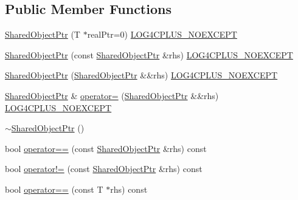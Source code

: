 \subsection*{Public Member Functions}
\begin{DoxyCompactItemize}
\item 
\hyperlink{classlog4cplus_1_1helpers_1_1SharedObjectPtr_a6387c14e4db27c8338825aa9ddc14c98}{Shared\-Object\-Ptr} (T $\ast$real\-Ptr=0) \hyperlink{config_8hxx_a77d156ef570ca81fe10eb864ea349506}{L\-O\-G4\-C\-P\-L\-U\-S\-\_\-\-N\-O\-E\-X\-C\-E\-P\-T}
\item 
\hyperlink{classlog4cplus_1_1helpers_1_1SharedObjectPtr_a7a40fbcc9c9942bdb6f7dc3adb574878}{Shared\-Object\-Ptr} (const \hyperlink{classlog4cplus_1_1helpers_1_1SharedObjectPtr}{Shared\-Object\-Ptr} \&rhs) \hyperlink{config_8hxx_a77d156ef570ca81fe10eb864ea349506}{L\-O\-G4\-C\-P\-L\-U\-S\-\_\-\-N\-O\-E\-X\-C\-E\-P\-T}
\item 
\hyperlink{classlog4cplus_1_1helpers_1_1SharedObjectPtr_a0a152d848cb890b66231dd88716318a2}{Shared\-Object\-Ptr} (\hyperlink{classlog4cplus_1_1helpers_1_1SharedObjectPtr}{Shared\-Object\-Ptr} \&\&rhs) \hyperlink{config_8hxx_a77d156ef570ca81fe10eb864ea349506}{L\-O\-G4\-C\-P\-L\-U\-S\-\_\-\-N\-O\-E\-X\-C\-E\-P\-T}
\item 
\hyperlink{classlog4cplus_1_1helpers_1_1SharedObjectPtr}{Shared\-Object\-Ptr} \& \hyperlink{classlog4cplus_1_1helpers_1_1SharedObjectPtr_a8cfd4cd7dea822742e4658293269b194}{operator=} (\hyperlink{classlog4cplus_1_1helpers_1_1SharedObjectPtr}{Shared\-Object\-Ptr} \&\&rhs) \hyperlink{config_8hxx_a77d156ef570ca81fe10eb864ea349506}{L\-O\-G4\-C\-P\-L\-U\-S\-\_\-\-N\-O\-E\-X\-C\-E\-P\-T}
\item 
\hyperlink{classlog4cplus_1_1helpers_1_1SharedObjectPtr_acea65ae76b84d7bafa18b1bb96c89287}{$\sim$\-Shared\-Object\-Ptr} ()
\item 
bool \hyperlink{classlog4cplus_1_1helpers_1_1SharedObjectPtr_a5a55c916bd3daeb3b4bb3c8b09101983}{operator==} (const \hyperlink{classlog4cplus_1_1helpers_1_1SharedObjectPtr}{Shared\-Object\-Ptr} \&rhs) const 
\item 
bool \hyperlink{classlog4cplus_1_1helpers_1_1SharedObjectPtr_a971a206613f919f9dd12f9bed99d48fc}{operator!=} (const \hyperlink{classlog4cplus_1_1helpers_1_1SharedObjectPtr}{Shared\-Object\-Ptr} \&rhs) const 
\item 
bool \hyperlink{classlog4cplus_1_1helpers_1_1SharedObjectPtr_aada5fd109c022747a76051de3ca7e170}{operator==} (const T $\ast$rhs) const 
\item 

\end{DoxyCompactItemize}
